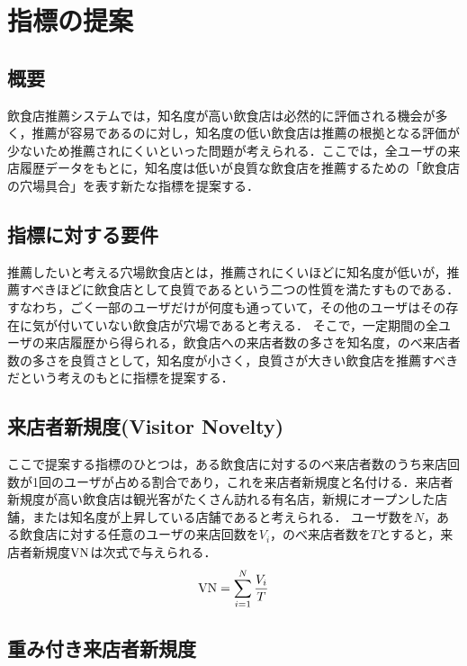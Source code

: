 \chapter{指標の提案}
\label{chap:proposal}

\section{概要}

飲食店推薦システムでは，知名度が高い飲食店は必然的に評価される機会が多く，推薦が容易であるのに対し，知名度の低い飲食店は推薦の根拠となる評価が少ないため推薦されにくいといった問題が考えられる．ここでは，全ユーザの来店履歴データをもとに，知名度は低いが良質な飲食店を推薦するための「飲食店の穴場具合」を表す新たな指標を提案する．

\section{指標に対する要件}

推薦したいと考える穴場飲食店とは，推薦されにくいほどに知名度が低いが，推薦すべきほどに飲食店として良質であるという二つの性質を満たすものである．
すなわち，ごく一部のユーザだけが何度も通っていて，その他のユーザはその存在に気が付いていない飲食店が穴場であると考える．
そこで，一定期間の全ユーザの来店履歴から得られる，飲食店への来店者数の多さを知名度，のべ来店者数の多さを良質さとして，知名度が小さく，良質さが大きい飲食店を推薦すべきだという考えのもとに指標を提案する．

\section{来店者新規度(Visitor Novelty)}

ここで提案する指標のひとつは，ある飲食店に対するのべ来店者数のうち来店回数が1回のユーザが占める割合であり，これを来店者新規度と名付ける．来店者新規度が高い飲食店は観光客がたくさん訪れる有名店，新規にオープンした店舗，または知名度が上昇している店舗であると考えられる．
ユーザ数を$N$，ある飲食店に対する任意のユーザの来店回数を$V_i$，のべ来店者数を$T$とすると，来店者新規度$\rm VN$は次式で与えられる．
\begin{equation}
	{\rm VN} = \sum^{N}_{i=1} \frac{V_i}{T}
\end{equation}

\section{重み付き来店者新規度}

